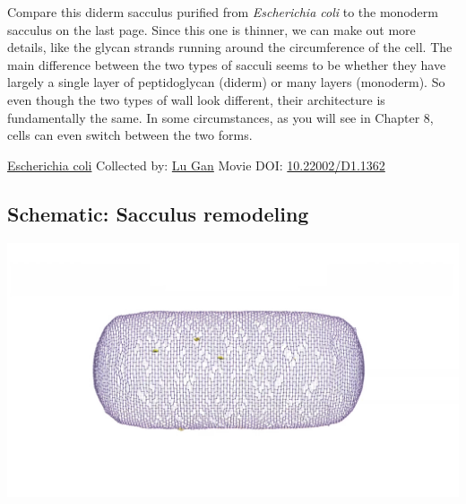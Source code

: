 \documentclass[]{tufte-book}
\begin{document}
Compare this diderm sacculus purified from \emph{Escherichia coli} to the monoderm sacculus on the last page. Since this one is thinner, we can make out more details, like the glycan strands running around the circumference of the cell. The main difference between the two types of sacculi seems to be whether they have largely a single layer of peptidoglycan (diderm) or many layers (monoderm). So even though the two types of wall look different, their architecture is fundamentally the same. In some circumstances, as you will see in Chapter 8, cells can even switch between the two forms.



\hypertarget{htmlwidget-84632230b70f5fd46636}{}

\label{fig:2-3a}\protect\hyperlink{tree}{Escherichia coli} Collected by: \protect\hyperlink{lu_gan}{Lu Gan} Movie DOI: \href{https://doi.org/10.22002/D1.1362}{10.22002/D1.1362}

\hypertarget{Sacculus_remodeling}{%
\subsection*{Schematic: Sacculus remodeling}\label{Sacculus_remodeling}}

\includegraphics{img/schematics/2_3_2}
\end{document}

